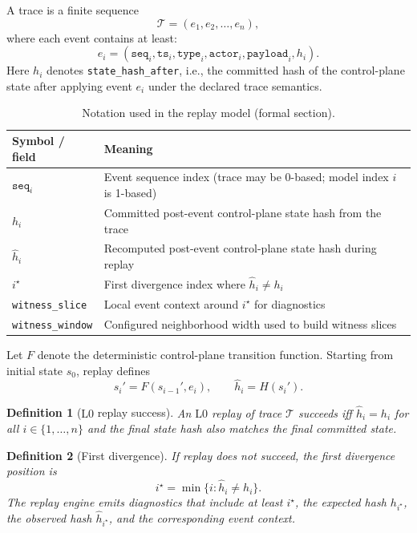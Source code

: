 \documentclass[11pt]{article}
\newcommand{\field}[1]{\texttt{#1}}
\newcommand{\Lzero}{\ensuremath{\mathrm{L0}}}
\newcommand{\trace}{\mathcal{T}}
\newcommand{\event}{e}
\newcommand{\state}{s}
\newcommand{\hashf}{H}
\newtheorem{definition}{Definition}
\begin{document}
A trace is a finite sequence
\[
\trace = (\event_1, \event_2, \ldots, \event_n),
\]
where each event contains at least:
\[
\event_i = (\texttt{seq}_i, \texttt{ts}_i, \texttt{type}_i, \texttt{actor}_i, \texttt{payload}_i, h_i).
\]
Here $h_i$ denotes \field{state\_hash\_after}, i.e., the committed hash of the control-plane state after applying event $\event_i$ under the declared trace semantics.

\begin{table}[H]
\centering
\caption{Notation used in the replay model (formal section).}
\label{tab:notation}
\begin{tabular}{ll}
\toprule
Symbol / field & Meaning \\
\midrule
$\texttt{seq}_i$ & Event sequence index (trace may be 0-based; model index $i$ is 1-based) \\
$h_i$ & Committed post-event control-plane state hash from the trace \\
$\hat{h}_i$ & Recomputed post-event control-plane state hash during replay \\
$i^\star$ & First divergence index where $\hat{h}_i \neq h_i$ \\
\field{witness\_slice} & Local event context around $i^\star$ for diagnostics \\
\field{witness\_window} & Configured neighborhood width used to build witness slices \\
\bottomrule
\end{tabular}
\end{table}

Let $F$ denote the deterministic control-plane transition function. Starting from initial state $\state_0$, replay defines
\[
\state_i' = F(\state_{i-1}', \event_i), \qquad \hat{h}_i = \hashf(\state_i').
\]

\begin{definition}[\Lzero{} replay success]
An \Lzero{} replay of trace $\trace$ succeeds iff $\hat{h}_i = h_i$ for all $i \in \{1,\dots,n\}$ and the final state hash also matches the final committed state.
\end{definition}

\begin{definition}[First divergence]
If replay does not succeed, the first divergence position is
\[
i^\star = \min\{ i : \hat{h}_i \neq h_i\}.
\]
The replay engine emits diagnostics that include at least $i^\star$, the expected hash $h_{i^\star}$, the observed hash $\hat{h}_{i^\star}$, and the corresponding event context.
\end{definition}
\end{document}
